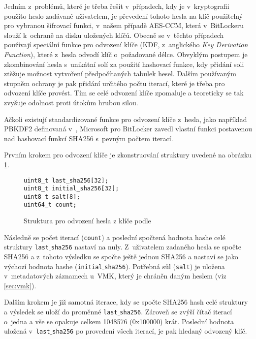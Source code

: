 \label{sec:kdf}

Jedním z~problémů, které je třeba řešit v~případech, kdy je v~kryptografii použito heslo zadávané uživatelem, je převedení tohoto hesla na klíč použitelný pro vybranou šifrovací funkci, v~našem případě AES-CCM, která v~BitLockeru slouží k~ochraně na disku uložených klíčů. Obecně se v~těchto případech používají speciální funkce pro odvození klíče (KDF, z~anglického \emph{Key Derivation Function}), které z~hesla odvodí klíč o~požadované délce. Obvyklým postupem je zkombinování hesla s~unikátní solí za použití hashovací funkce, kdy přidání soli ztěžuje možnost vytvoření předpočítaných tabulek hesel. Dalším používaným stupněm ochrany je pak přidání určitého počtu iterací, které je třeba pro odvození klíče provést. Tím se celé odvození klíče zpomaluje a teoreticky se tak zvyšuje odolnost proti útokům hrubou silou.\cite{Kaliski2000}

Ačkoli existují standardizované funkce pro odvození klíče z~hesla, jako například PBKDF2 definovaná v~\cite{Kaliski2000}, Microsoft pro BitLocker zavedl vlastní funkci postavenou nad hashovací funkcí SHA256\cite{FIPS180-4} s~pevným počtem iterací.

Prvním krokem pro odvození klíče je zkonstruování struktury uvedené na obrázku \ref{fig:bitlocker-kdf}.

\begin{figure}[h]
		\centering
		\captionsetup{width=0.65\linewidth}
\begin{lstlisting}[frame=none, escapechar=$, basicstyle=\ttfamily\small, columns=fullflexible, keepspaces=true, xleftmargin=.35\textwidth, xrightmargin=.35\textwidth]
uint8_t last_sha256[32];
uint8_t initial_sha256[32];
uint8_t salt[8];
uint64_t count;
\end{lstlisting}
		\caption{Struktura pro odvození hesla z klíče podle \cite{Metz2011}}
		\label{fig:bitlocker-kdf}
\end{figure}

Následně se počet iterací (\texttt{count}) a poslední spočtená hodnota hashe celé struktury \texttt{last$\_$sha256} nastaví na nuly. Z~uživatelem zadaného hesla se spočte SHA256 a z~tohoto výsledku se spočte ještě jednou SHA256 a nastaví se jako výchozí hodnota hashe (\texttt{initial$\_$sha256}). Potřebná sůl (\texttt{salt}) je uložena v~metadatových záznamech u~VMK, který je chráněn daným heslem (viz \ref{sec:vmk}).

Dalším krokem je již samotná iterace, kdy se spočte SHA256 hash celé struktury a výsledek se uloží do proměnné \texttt{last$\_$sha256}. Zároveň se zvýší čítač iterací o~jedna a vše se opakuje celkem 1048576 (0x100000) krát. Poslední hodnota uložená v~\texttt{last$\_$sha256} po provedení všech iterací, je pak hledaný odvozený klíč.\cite{Metz2011,Agostini2019}

